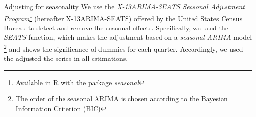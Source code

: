 \myparagraph Adjusting for seasonality
We use the \textit{X-13ARIMA-SEATS Seasonal Adjustment Program}\footnote{Available in R with the package \textit{seasonal}} (hereafter X-13ARIMA-SEATS) offered by the United States Census Bureau to detect and remove the seasonal effects. Specifically, we used the \textit{SEATS} function, which makes the adjustment based on a \textit{seasonal ARIMA} model \footnote{The order of the seasonal ARIMA is chosen according to the Bayesian Information Criterion (BIC)} and shows the significance of dummies for each quarter. Accordingly, we used the adjusted the series in all estimations.